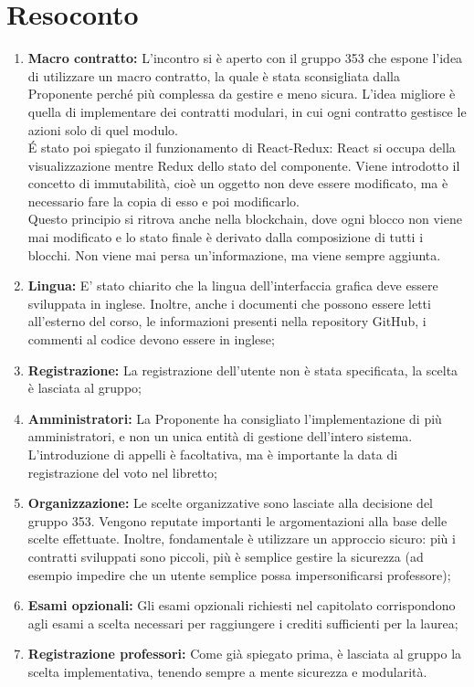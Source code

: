 \documentclass[RaccoltaVerbali.tex]{subfiles}
\begin{document}
\section{Resoconto}
\begin{enumerate}
	\item \textbf{Macro contratto:} L'incontro si è aperto con il gruppo 353 che espone l'idea di utilizzare un macro contratto, la quale è stata sconsigliata dalla Proponente perché più complessa da gestire e meno sicura. L'idea migliore è quella di implementare dei contratti modulari, in cui ogni contratto gestisce le azioni solo di quel modulo.\\
	\'{E} stato poi spiegato il funzionamento di React-Redux: React si occupa della visualizzazione mentre Redux dello stato del componente. Viene introdotto il concetto di immutabilità, cioè un oggetto non deve essere modificato, ma è necessario fare la copia di esso e poi modificarlo.\\
	Questo principio si ritrova anche nella blockchain, dove ogni blocco non viene mai modificato e lo stato finale è derivato dalla composizione di tutti i blocchi. Non viene mai persa un'informazione, ma viene sempre aggiunta.
	\item \textbf{Lingua:} E' stato chiarito che la lingua dell'interfaccia grafica deve essere sviluppata in inglese. Inoltre, anche i documenti che possono essere letti all'esterno del corso, le informazioni presenti nella repository GitHub, i commenti al codice devono essere in inglese;
	\item \textbf{Registrazione:} La registrazione dell'utente non è stata specificata, la scelta è lasciata al gruppo;
	\item \textbf{Amministratori:} La Proponente ha consigliato l'implementazione di più amministratori, e non un unica entità di gestione dell'intero sistema. L'introduzione di appelli è facoltativa, ma è importante la data di registrazione del voto nel libretto;
	\item \textbf{Organizzazione:} Le scelte organizzative sono lasciate alla decisione del gruppo 353. Vengono reputate importanti le argomentazioni alla base delle scelte effettuate. Inoltre, fondamentale è utilizzare un approccio sicuro: più i contratti sviluppati sono piccoli, più è semplice gestire la sicurezza (ad esempio impedire che un utente semplice possa impersonificarsi professore);
	\item \textbf{Esami opzionali:} Gli esami opzionali richiesti nel capitolato corrispondono agli esami a scelta necessari per raggiungere i crediti sufficienti per la laurea;
	\item \textbf{Registrazione professori:} Come già spiegato prima, è lasciata al gruppo la scelta implementativa, tenendo sempre a mente sicurezza e modularità.
\end{enumerate}
\end{document}
